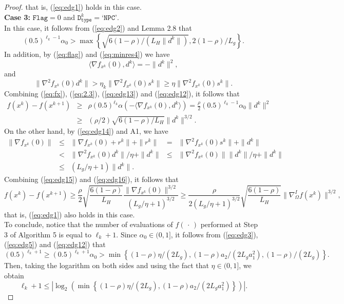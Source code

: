 \documentclass[10pt,a4paper]{amsart}
\begin{document}
\begin{proof}
that is, (\ref{eq:edg1}) holds in this case.
\\[0.2cm]
\noindent\textbf{Case 3:} $\texttt{Flag}=0$ and $\texttt{D}_{\texttt{type}}^{k}=\texttt{`NPC'}$.
\\[0.2cm]
\noindent In this case, it follows from (\ref{eq:edg2}) and Lemma 2.8 that
\begin{equation}
(0.5)^{\ell_{k}-1}\alpha_{0}>\max\left\{\sqrt{6(1-\rho)/(L_{H}\|d^{k}\|)},2(1-\rho)/L_{g}\right\}.
\label{eq:edg12}
\end{equation}
In addition, by (\ref{eq:flag}) and (\ref{eq:minres4}) we have
\begin{equation}
    \langle\nabla f_{x^{k}}(0),d^{k}\rangle=-\|d^{k}\|^{2},
    \label{eq:edg13}
\end{equation}
and
\begin{equation}
\|\nabla^{2}f_{x^{k}}(0)d^{k}\|>\eta_{k}\|\nabla^{2}f_{x^{k}}(0)s^{k}\|\geq \eta\|\nabla^{2}f_{x^{k}}(0)s^{k}\| .
    \label{eq:edg14}
\end{equation}
Combining (\ref{eq:fx}), (\ref{eq:2.3}), (\ref{eq:edg13}) and (\ref{eq:edg12}), it follows that
\small
\begin{eqnarray}
f(x^{k})-f(x^{k+1})&\geq& 
\rho (0.5)^{\ell_{k}}\alpha\left(-\langle\nabla f_{x^{k}}(0),d^{k}\rangle\right)=\frac{\rho}{2}(0.5)^{\ell_{k}-1}\alpha_{0}\|d^{k}\|^{2}\nonumber\\
&\geq &(\rho/2)\sqrt{6(1-\rho)/L_{H}}\|d^{k}\|^{3/2}.
\label{eq:edg15}
\end{eqnarray}
\normalsize
On the other hand, by (\ref{eq:edg14}) and A1, we have
\small
\begin{equation} \label{eq:edg16}
\begin{array}{lclcl}
\|\nabla f_{x^{k}}(0)\| & \leq & \|\nabla f_{x^{k}}(0)+r^{k}\|+\|r^{k}\| & = & \|\nabla^{2} f_{x^{k}}(0)s^{k}\|+\|d^{k}\| \\[2mm]
& < & \|\nabla^{2} f_{x^{k}}(0)d^{k}\| / \eta+\|d^{k}\| & \leq & \|\nabla^{2}f_{x^{k}}(0)\|\|d^{k}\| / \eta +\|d^{k}\| \\[2mm]
& \leq & (L_{g}/\eta+1) \|d^{k}\|. & & 
\end{array}
\end{equation}
\normalsize
Combining (\ref{eq:edg15}) and (\ref{eq:edg16}), it follows that
\small
\[
f(x^{k})-f(x^{k+1}) 
\geq 
\frac{\rho}{2}\sqrt{\frac{6(1-\rho)}{L_{H}}}\frac{\|\nabla f_{x^{k}}(0)\|^{3/2}}{(L_{g}/\eta+1)^{3/2}}
\geq \frac{\rho}{2(L_{g}/\eta+1)^{3/2}}\sqrt{\frac{6(1-\rho)}{L_{H}}}\|\nabla_{\Omega}^{I}f(x^{k})\|^{3/2},
\]
\normalsize
that is, (\ref{eq:edg1}) also holds in this case.
\\[0.2cm]
To conclude, notice that the number of evaluations of $f(\,\cdot\,)$ performed at Step 3 of Algorithm 5 is equal to $\ell_{k}+1$. Since $\alpha_{0}\in (0,1]$, it follows from (\ref{eq:edg3}), (\ref{eq:edg5}) and (\ref{eq:edg12}) that
\[
(0.5)^{\ell_{k}+1}\geq (0.5)^{\ell_{k}+1}\alpha_{0}>\min\left\{(1-\rho)\eta/(2L_{g}), (1-\rho)a_{2}/(2L_{g}a_{1}^{2}),(1-\rho)/(2L_{g})\right\}.
\]
Then, taking the logarithm on both sides and using the fact that $\eta\in (0,1]$, we obtain
\[
\ell_{k}+1\leq\left|\log_{2}\left(\min\left\{(1-\rho)\eta/(2L_{g}),(1-\rho)a_{2}/(2L_{g}a_{1}^{2})\right\}\right)\right|.
\]
\end{proof}
\end{document}

